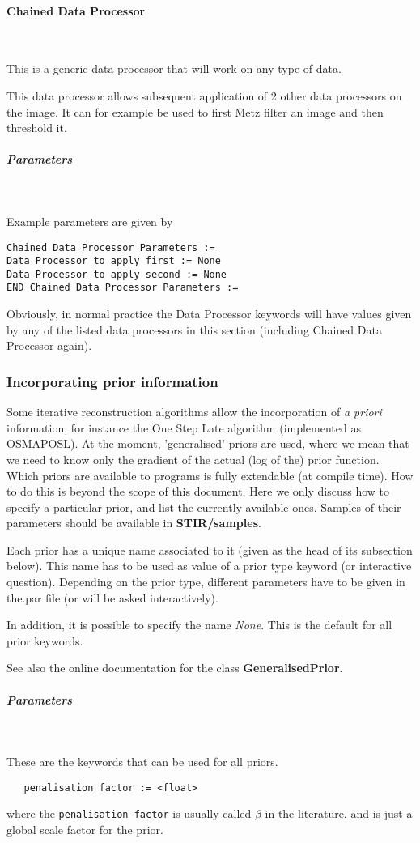 \documentclass{article}
\newcommand{\subsubsubsection}[1]{\paragraph{#1}\mbox{} \\}
\newcommand{\subsubsubsubsection}[1]{\subparagraph{#1} \mbox{} \\}
\begin{document}
{{{ \subsubsubsection{Chained Data Processor}
}
This is a generic data processor that will work on any type of data.

This data processor allows subsequent application of 2 other 
data processors on the image. It can for example be used to 
first Metz filter an image and then threshold it.

{ \subsubsubsubsection{Parameters}
}
Example parameters are given by
\begin{verbatim}
Chained Data Processor Parameters :=
Data Processor to apply first := None
Data Processor to apply second := None
END Chained Data Processor Parameters :=
\end{verbatim}

Obviously, in normal practice the Data Processor keywords will 
have values given by any of the listed data processors in this 
section (including Chained Data Processor again).



\subsubsection{
Incorporating prior information}
\label{sec:priors}
Some iterative reconstruction algorithms allow the incorporation 
of \textit{a priori} information, for instance the One Step Late algorithm 
(implemented as OSMAPOSL). At the moment, 'generalised' priors 
are used, where we mean that we need to know only the gradient 
of the actual (log of the) prior function.\\
Which priors are available to programs is fully extendable (at 
compile time). How to do this is beyond the scope of this document. 
Here we only discuss how to specify a particular prior, and list 
the currently available ones. Samples of their parameters should 
be available in \textbf{STIR/samples}.



Each prior has a unique name associated to it (given as the head 
of its subsection below). This name has to be used as value of 
a prior type keyword (or interactive question). Depending on 
the prior type, different parameters have to be given in the.par 
file (or will be asked interactively).


In addition, it is possible to specify the name \textit{None}. This 
is the default for all prior keywords.


See also the online documentation for the class \textbf{GeneralisedPrior}.


{ \subsubsubsubsection{Parameters}
}
These are the keywords that can be used for all priors.
  \begin{verbatim}
   penalisation factor := <float>
  \end{verbatim}
  \noindent where the \texttt{penalisation factor} is usually called
  $\beta$ in the literature, and is just a global scale factor for the
  prior.

}}
\end{document}
